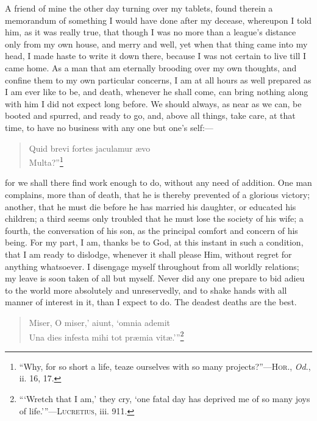 A friend of mine the other day turning over my tablets, found therein
a memorandum of something I would have done after my decease,
whereupon I told him, as it was really true, that though I was no more
than a league's distance only from my own house, and merry and well,
yet when that thing came into my head, I made haste to write it down
there, because I was not certain to live till I came home. As a man
that am eternally brooding over my own thoughts, and confine them to
my own particular concerns, I am at all hours as well prepared as I am
ever like to be, and death, whenever he shall come, can bring nothing
along with him I did not expect long before. We should always, as near
as we can, be booted and spurred, and ready to go, and, above all
things, take care, at that time, to have no business with any one but
one's self:---

\begin{verse}
Quid brevi fortes jaculamur \ae vo\\
Multa?''\footnote{``Why, for so short a life, teaze ourselves with so
many projects?''---\textsc{Hor}., \textit{Od}., ii. 16, 17.}
\end{verse}

\noindent for we shall there find work enough to do, without
any need of addition. One man complains, more than of death, that he
is thereby prevented of a glorious victory; another, that he must die
before he has married his daughter, or educated his children; a third
seems only troubled that he must lose the society of his wife; a
fourth, the conversation of his son, as the principal comfort and
concern of his being. For my part, I am, thanks be to God, at this
instant in such a condition, that I am ready to dislodge, whenever it
shall please Him, without regret for anything whatsoever. I disengage
myself throughout from all worldly relations; my leave is soon taken
of all but myself. Never did any one prepare to bid adieu to the world
more absolutely and unreservedly, and to shake hands with all manner
of interest in it, than I expect to do. The deadest deaths are the
best.

\begin{verse}
\vin {}Miser, O miser,' aiunt, `omnia ademit\\
Una dies infesta mihi tot pr\ae mia vit\ae.'''\footnote{```Wretch that I
am,' they cry, `one fatal day has deprived me of so many joys of
life.'''---\textsc{Lucretius}, iii. 911.}
\end{verse}

